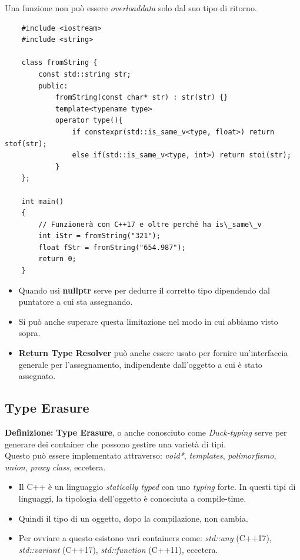 \textsf{\small Una funzione non può essere \emph{overloaddata} solo dal suo tipo di ritorno.} \\

\begin{lstlisting}
	#include <iostream>
	#include <string>
	
	class fromString {
		const std::string str;
		public:
			fromString(const char* str) : str(str) {}
			template<typename type>
			operator type(){
				if constexpr(std::is_same_v<type, float>) return stof(str);
				else if(std::is_same_v<type, int>) return stoi(str);
			}
	};

	int main()
	{
		// Funzionerà con C++17 e oltre perché ha is\_same\_v
		int iStr = fromString("321");
		float fStr = fromString("654.987");
		return 0;
	}
\end{lstlisting}


\begin{itemize}
	\item \textsf{\small Quando usi \textbf{nullptr} serve per dedurre il corretto tipo dipendendo dal puntatore a cui sta assegnando.}
	\item \textsf{\small Si può anche superare questa limitazione nel modo in cui abbiamo visto sopra.}
	\item \textsf{\small \textbf{Return Type Resolver} può anche essere usato per fornire un'interfaccia generale per l'assegnamento, indipendente dall'oggetto a cui è stato assegnato.}
\end{itemize}

\subsection{Type Erasure}

\textsf{\small \textbf{Definizione: } \textbf{Type Erasure}, o anche conosciuto come \emph{Duck-typing} serve per generare dei container che possono gestire una varietà di tipi.} \\

\textsf{\small Questo può essere implementato attraverso: \emph{void*}, \emph{templates}, \emph{polimorfismo}, \emph{union}, \emph{proxy class}, eccetera.} \break

\begin{itemize}
	\item \textsf{\small Il C++ è un linguaggio \emph{statically typed} con uno \emph{typing} forte. In questi tipi di linguaggi, la tipologia dell'oggetto è conosciuta a compile-time.} %
	\item \textsf{\small Quindi il tipo di un oggetto, dopo la compilazione, non cambia.}
	\item \textsf{\small Per ovviare a questo esistono vari containers come: \emph{std::any} (C++17), \emph{std::variant} (C++17), \emph{std::function} (C++11), eccetera.}
\end{itemize}

